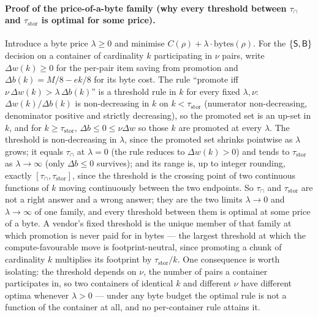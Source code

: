 \paragraph*{Proof of the price-of-a-byte family (why every threshold between $\tau_\cap$ and
$\tau_{\mathrm{stor}}$ is optimal for some price).}
Introduce a byte price $\lambda\ge0$ and minimise $C(\rho)+\lambda\cdot\mathrm{bytes}(\rho)$. For the
$\{\textsf{S},\textsf{B}\}$ decision on a container of cardinality $k$ participating in $\nu$ pairs, write
$\Delta w(k)\ge0$ for the per-pair item saving from promotion and $\Delta b(k)=M/8-ek/8$ for its byte
cost. The rule ``promote iff $\nu\,\Delta w(k)>\lambda\,\Delta b(k)$'' is a threshold rule in $k$ for
every fixed $\lambda,\nu$: $\Delta w(k)/\Delta b(k)$ is non-decreasing in $k$ on $k<\tau_{\mathrm{stor}}$
(numerator non-decreasing, denominator positive and strictly decreasing), so the promoted set is an
up-set in $k$, and for $k\ge\tau_{\mathrm{stor}}$, $\Delta b\le0\le\nu\Delta w$ so those $k$ are
promoted at every $\lambda$. The threshold is non-decreasing in $\lambda$, since the promoted set
shrinks pointwise as $\lambda$ grows; it equals $\tau_\cap$ at $\lambda=0$ (the rule reduces to
$\Delta w(k)>0$) and tends to $\tau_{\mathrm{stor}}$ as $\lambda\to\infty$ (only $\Delta b\le0$
survives); and its range is, up to integer rounding, exactly $[\tau_\cap,\tau_{\mathrm{stor}}]$, since
the threshold is the crossing point of two continuous functions of $k$ moving continuously between the
two endpoints. So $\tau_\cap$ and $\tau_{\mathrm{stor}}$ are not a right answer and a wrong
answer; they are the two limits $\lambda\to0$ and $\lambda\to\infty$ of one family, and every threshold
between them is optimal at some price of a byte. A vendor's fixed threshold is the unique member of
that family at which promotion is never paid for in bytes --- the largest threshold at which the
compute-favourable move is footprint-neutral, since promoting a chunk of cardinality $k$ multiplies its
footprint by $\tau_{\mathrm{stor}}/k$. One consequence is worth isolating: the threshold depends on
$\nu$, the number of pairs a container participates in, so two containers of identical $k$ and
different $\nu$ have different optima whenever $\lambda>0$ --- under any byte budget the optimal rule
is not a function of the container at all, and no per-container rule attains it.

